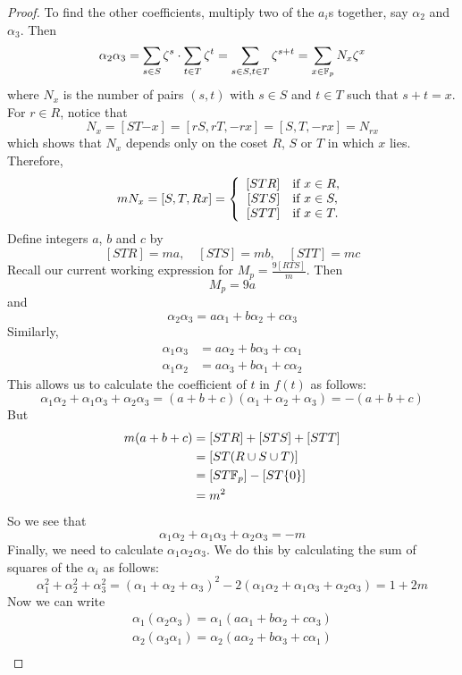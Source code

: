 \begin{proof}
To find the other coefficients, multiply two of the $a_i$s together, say $\alpha_2$ and $\alpha_3$. Then
$$\alpha_2 \alpha_3 = \sum_{s\in S} \zeta^s \cdot \sum_{t\in T}\zeta^t=\sum_{s \in S, t\in T}\zeta^{s+t} = \sum_{x\in \mathbb{F}_p}N_x \zeta^x$$
where $N_x$ is the number of pairs $(s,t)$ with $s \in S$ and $t \in T$ such that $s+t=x$. For $r \in R$, notice that
$$N_x = [ST{-x}] = [rS,rT,{-rx}]=[S,T,{-rx}]=N_{rx}$$
which shows that $N_x$ depends only on the coset $R$, $S$ or $T$ in which $x$ lies. Therefore,
\begin{equation*}
	mN_x = [S,T,Rx] = \left\{
		\begin{array}{rl}
			{[STR]} & \text{if } x \in R,\\
			{[STS]} & \text{if } x \in S,\\
			{[STT]} & \text{if } x \in T.
		\end{array}
		\right.
\end{equation*}
Define integers $a$, $b$ and $c$ by
$$[STR] = ma,\quad [STS] = mb,\quad [STT] = mc$$
Recall our current working expression for $M_p=\frac{9[RTS]}{m}$. Then
$$M_p = 9a$$
and
$$\alpha_2\alpha_3 = a\alpha_1 + b\alpha_2 + c\alpha_3$$
Similarly,
\begin{align*}
	\alpha_1\alpha_3 &= a\alpha_2 + b\alpha_3 + c\alpha_1\\
	\alpha_1\alpha_2 &= a\alpha_3 + b\alpha_1 + c\alpha_2
\end{align*}
This allows us to calculate the coefficient of $t$ in $f(t)$ as follows:
$$\alpha_1\alpha_2 +\alpha_1\alpha_3 +\alpha_2\alpha_3 = (a + b + c)(\alpha_1 + \alpha_2 + \alpha_3) = -(a + b + c)$$
But
\begin{align*}
	m(a + b + c) &= [STR] + [STS] + [STT]\\
		     &= [ST(R\cup S\cup T)]\\
	      &= [ST\mathbb{F}_p] - [ST\{0\}]\\
	      &= m^2
\end{align*}
So we see that
$$\alpha_1\alpha_2 +\alpha_1\alpha_3 +\alpha_2\alpha_3 = -m$$
Finally, we need to calculate $\alpha_1\alpha_2\alpha_3$. We do this by calculating the sum of squares of the $\alpha_i$ as follows:
$$\alpha_1^2 + \alpha_2^2 + \alpha_3^2 = (\alpha_1 + \alpha_2 + \alpha_3)^2 - 2(\alpha_1\alpha_2 +\alpha_1\alpha_3 +\alpha_2\alpha_3) = 1 + 2m$$
Now we can write
\begin{align*}
	\alpha_1 (\alpha_2 \alpha_3) = \alpha_1 (a\alpha_1 + b\alpha_2 + c\alpha_3)\\
	\alpha_2 (\alpha_3 \alpha_1) = \alpha_2 (a\alpha_2 + b\alpha_3 + c\alpha_1)\\

\end{align*}
\end{proof}
